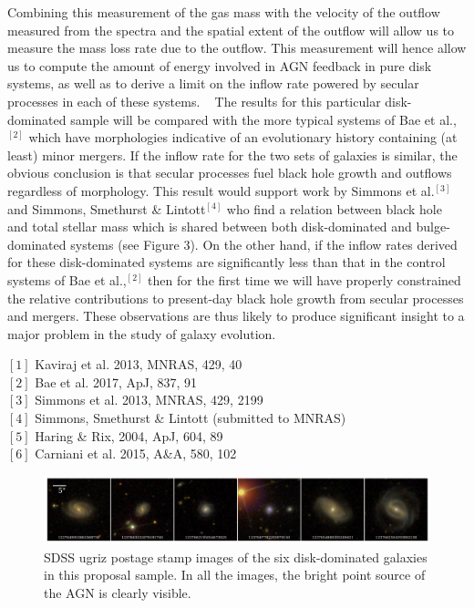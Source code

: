 \documentclass[12pt]{article}
\begin{document}
Combining this measurement of the gas mass with the velocity of the outflow measured from the spectra and the spatial extent of the outflow will allow us to measure the mass loss rate due to the outflow. This measurement will hence allow us to compute the amount of energy involved in AGN feedback in pure disk systems, as well as to derive a limit on the inflow rate powered by secular processes in each of these systems. 
\vspace{0.25em}
 
The results for this particular disk-dominated sample will be compared with the more typical systems of Bae et al.,$^{[2]}$ which have morphologies indicative of an evolutionary history containing (at least) minor mergers. If the inflow rate for the two sets of galaxies is similar, the obvious conclusion is that secular processes fuel black hole growth and outflows regardless of morphology. This result would support work by Simmons et al.$^{[3]}$ and Simmons, Smethurst \& Lintott$^{[4]}$ who find a relation between black hole and total stellar mass which is shared between both disk-dominated and bulge-dominated systems (see Figure 3). On the other hand, if the inflow rates derived for these disk-dominated systems are significantly less than that in the control systems of Bae et al.,$^{[2]}$ then for the first time we will have properly constrained the relative contributions to present-day black hole growth from secular processes and mergers. These observations are thus likely to produce significant insight to a major problem in the study of galaxy evolution. 
\vspace{1.5em}


\vspace{0.5em}


\noindent
$[1]$ Kaviraj et al. 2013, MNRAS, 429, 40
\\
$[2]$ Bae et al. 2017, ApJ, 837, 91
\\
$[3]$ Simmons et al. 2013, MNRAS, 429, 2199 
\\
$[4]$ Simmons, Smethurst \& Lintott (submitted to MNRAS)
\\
$[5]$ Haring \& Rix, 2004, ApJ, 604, 89
\\
$[6]$ Carniani et al. 2015, A\&A, 580, 102

\begin{figure}[h]
\includegraphics[width=\textwidth]{mosaic_6_2017B_obs.png}
\caption{SDSS ugriz postage stamp images of the six disk-dominated galaxies in this proposal sample. In all the images, the bright point source of the AGN is clearly visible.}
\end{figure}
\end{document}
